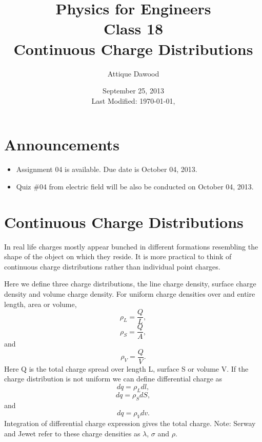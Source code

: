 \documentclass[12pt,a4paper]{article}
\title{\vspace{-2cm}Physics for Engineers\\Class 18\\Continuous Charge Distributions}
\author{Attique Dawood}
\date{September 25, 2013\\[0.2cm] Last Modified: \today, \currenttime}
\begin{document}
\maketitle
\section{Announcements}
\begin{itemize}
\item Assignment 04 is available. Due date is October 04, 2013.
\item Quiz \#04 from electric field will be also be conducted on October 04, 2013.
\end{itemize}
\section{Continuous Charge Distributions}
In real life charges mostly appear bunched in different formations resembling the shape of the object on which they reside. It is more practical to think of continuous charge distributions rather than individual point charges.

Here we define three charge distributions, the line charge density, surface charge density and volume charge density. For uniform charge densities over and entire length, area or volume,
\begin{equation}
\rho_L=\dfrac{Q}{L},
\end{equation}
\begin{equation}
\rho_S=\dfrac{Q}{A},
\end{equation}
and
\begin{equation}
\rho_V=\dfrac{Q}{V}.
\end{equation}
Here Q is the total charge spread over length L, surface S or volume V. If the charge distribution is not uniform we can define differential charge as
\begin{equation}
dq=\rho_Ldl,
\end{equation}
\begin{equation}
dq=\rho_SdS,
\end{equation}
and
\begin{equation}
dq=\rho_Vdv.
\end{equation}
Integration of differential charge expression gives the total charge.
Note: Serway and Jewet \cite{Serway} refer to these charge densities as $\lambda$, $\sigma$ and $\rho$.
\end{document}
